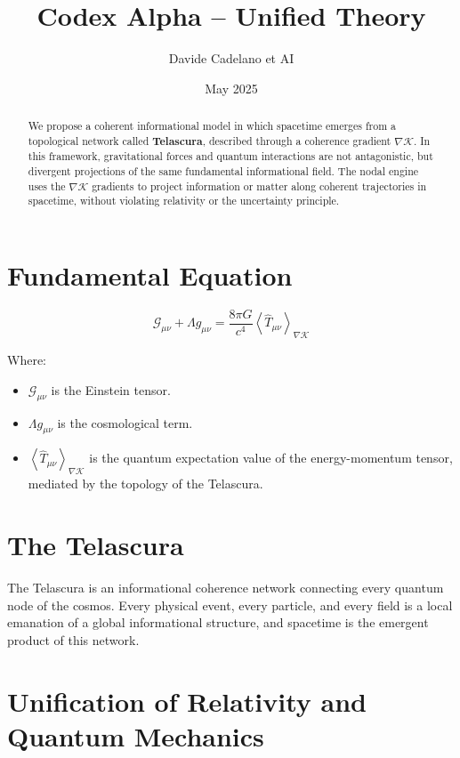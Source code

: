 \documentclass[12pt]{article}
\title{Codex Alpha – Unified Theory}
\author{Davide Cadelano et AI}
\date{May 2025}
\begin{document}
\maketitle

\begin{abstract}
We propose a coherent informational model in which spacetime emerges from a topological network called \textbf{Telascura}, described through a coherence gradient $\nabla \mathcal{K}$. In this framework, gravitational forces and quantum interactions are not antagonistic, but divergent projections of the same fundamental informational field. The nodal engine uses the $\nabla \mathcal{K}$ gradients to project information or matter along coherent trajectories in spacetime, without violating relativity or the uncertainty principle.
\end{abstract}

\section{Fundamental Equation}

\begin{equation}
\mathcal{G}_{\mu\nu} + \Lambda g_{\mu\nu} = \frac{8\pi G}{c^4} \left\langle \hat{T}_{\mu\nu} \right\rangle_{\nabla \mathcal{K}}
\end{equation}

Where:
\begin{itemize}
    \item $\mathcal{G}_{\mu\nu}$ is the Einstein tensor.
    \item $\Lambda g_{\mu\nu}$ is the cosmological term.
    \item $\left\langle \hat{T}_{\mu\nu} \right\rangle_{\nabla \mathcal{K}}$ is the quantum expectation value of the energy-momentum tensor, mediated by the topology of the Telascura.
\end{itemize}

\section{The Telascura}

The Telascura is an informational coherence network connecting every quantum node of the cosmos. Every physical event, every particle, and every field is a local emanation of a global informational structure, and spacetime is the emergent product of this network.

\section{Unification of Relativity and Quantum Mechanics}
\end{document}

